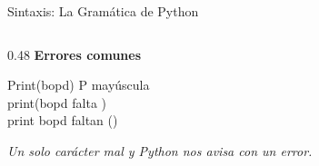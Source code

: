 \documentclass[aspectratio=169, 11pt]{beamer}
\begin{document}
\begin{frame}[fragile]{Sintaxis: La Gramática de Python}
\begin{columns}[T]
\begin{column}{0.48\textwidth}
      \vspace{3pt}
      {\small\color{arcaRed}\bfseries\faTimes\hspace{4pt}Errores comunes}
      \begin{tcolorbox}[
        colback=arcaGray, colframe=arcaRed, boxrule=0pt, leftrule=3pt,
        arc=2pt, left=5pt, right=5pt, top=2pt, bottom=2pt
      ]
        {\scriptsize\ttfamily\color{textDark}
        Print(bopd)\hspace{10pt}}{\tiny\color{arcaRed} P mayúscula}\\
        {\scriptsize\ttfamily\color{textDark}
        print(bopd\hspace{12pt}}{\tiny\color{arcaRed} falta )}\\
        {\scriptsize\ttfamily\color{textDark}
        print bopd\hspace{12pt}}{\tiny\color{arcaRed} faltan ()}
      \end{tcolorbox}

      \vspace{2pt}
      {\scriptsize\color{textMuted}\itshape
        Un solo carácter mal y Python nos avisa con un error.}
    \end{column}
  \end{columns}
\end{frame}
\end{document}

